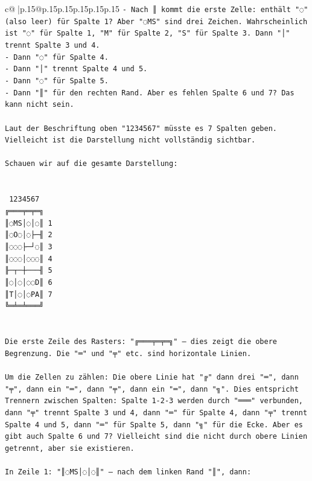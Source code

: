 \documentclass{article}
\begin{document}
{\begin{supertabular}{c@{$\;$}|p{.15\linewidth}@{}p{.15\linewidth}p{.15\linewidth}p{.15\linewidth}p{.15\linewidth}p{.15\linewidth}}
{{{\texttt{{-} Nach ║ kommt die erste Zelle: enthält "◌" (also leer) für Spalte 1? Aber "◌MS" sind drei Zeichen. Wahrscheinlich ist "◌" für Spalte 1, "M" für Spalte 2, "S" für Spalte 3. Dann "│" trennt Spalte 3 und 4.} \\
\texttt{{-} Dann "◌" für Spalte 4.} \\
\texttt{{-} Dann "│" trennt Spalte 4 und 5.} \\
\texttt{{-} Dann "◌" für Spalte 5.} \\
\texttt{{-} Dann "║" für den rechten Rand. Aber es fehlen Spalte 6 und 7? Das kann nicht sein.} \\
\\ 
\texttt{Laut der Beschriftung oben "1234567" müsste es 7 Spalten geben. Vielleicht ist die Darstellung nicht vollständig sichtbar.} \\
\\ 
\texttt{Schauen wir auf die gesamte Darstellung:} \\
\\ 
\\ 
\texttt{ 1234567} \\
\texttt{╔═══╤═╤═╗} \\
\texttt{║◌MS│◌│◌║ 1} \\
\texttt{║◌O◌│◌├─╢ 2} \\
\texttt{║◌◌◌├─┘◌║ 3} \\
\texttt{║◌◌◌│◌◌◌║ 4} \\
\texttt{╟─┬─┼───╢ 5} \\
\texttt{║◌│◌│◌◌D║ 6} \\
\texttt{║T│◌│◌PA║ 7} \\
\texttt{╚═╧═╧═══╝} \\
\\ 
\\ 
\texttt{Die erste Zeile des Rasters: "╔═══╤═╤═╗" – dies zeigt die obere Begrenzung. Die "═" und "╤" etc. sind horizontale Linien.} \\
\\ 
\texttt{Um die Zellen zu zählen: Die obere Linie hat "╔" dann drei "═", dann "╤", dann ein "═", dann "╤", dann ein "═", dann "╗". Dies entspricht Trennern zwischen Spalten: Spalte 1{-}2{-}3 werden durch "═══" verbunden, dann "╤" trennt Spalte 3 und 4, dann "═" für Spalte 4, dann "╤" trennt Spalte 4 und 5, dann "═" für Spalte 5, dann "╗" für die Ecke. Aber es gibt auch Spalte 6 und 7? Vielleicht sind die nicht durch obere Linien getrennt, aber sie existieren.} \\
\\ 
\texttt{In Zeile 1: "║◌MS│◌│◌║" – nach dem linken Rand "║", dann:} \\
}}}
\end{supertabular}}
\end{document}
